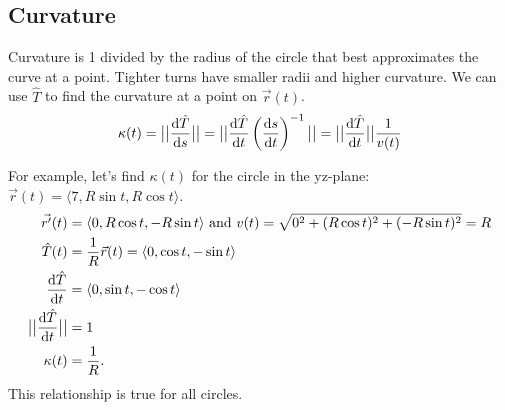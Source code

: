 \subsection{Curvature}
Curvature is 1 divided by the radius of the circle that best approximates the curve at a point.
Tighter turns have smaller radii and higher curvature.
We can use $\hat{T}$ to find the curvature at a point on $\vec{r}(t)$.
\begin{equation*}
	\kappa(t) = \big\lvert \big\lvert \frac{\mathrm{d} \hat{T}}{\mathrm{d} s} \big\rvert \big\rvert = \big\lvert \big\lvert \frac{\mathrm{d} \hat{T}}{\mathrm{d} t}\left(\frac{\mathrm{d} s}{\mathrm{d} t}\right)^{-1} \big\rvert \big\rvert = \big\lvert \big\lvert \frac{\mathrm{d} \hat{T}}{\mathrm{d} t} \big\rvert \big\rvert\frac{1}{v(t)}
\end{equation*}

\noindent
For example, let's find $\kappa(t)$ for the circle in the yz-plane: $\vec{r}(t)=\langle 7, R\sin{t}, R\cos{t} \rangle$.
\begin{align*}
	\vec{r^\prime}(t) &= \langle 0, R\cos{t}, -R\sin{t}\rangle
	\text{ and }
	v(t) = \sqrt{0^2+(R\cos{t})^2+(-R\sin{t})^2} = R \\
	\hat{T}(t) &= \frac{1}{R}\vec{r}(t) = \langle0,\cos{t},-\sin{t}\rangle \\
	\frac{\mathrm{d}\hat{T}}{\mathrm{d}t} &= \langle 0,\sin{t},-\cos{t}\rangle \\
	\big\lvert \big\lvert \frac{\mathrm{d}\hat{T}}{\mathrm{d}t} \big\rvert \big\rvert &= 1 \\
	\kappa(t) &= \frac{1}{R}.
\end{align*}
This relationship is true for all circles.